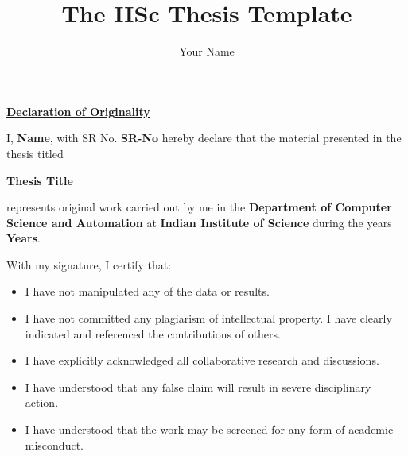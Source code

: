 
\title{The IISc Thesis Template}

\submitdate{\monthyeardate\today}
\mtechresearch
\author{Your Name}


\maketitle



\begin{center}
\LARGE{\underline{\textbf{Declaration of Originality}}}
\end{center}
\noindent I, \textbf{Name}, with SR No. \textbf{SR-No} hereby declare that
the material presented in the thesis titled

\begin{center}
\textbf{Thesis Title}
\end{center}

\noindent represents original work carried out by me in the \textbf{Department of Computer Science and Automation} at \textbf{Indian Institute of Science} during the years \textbf{Years}.

\noindent With my signature, I certify that:
\begin{itemize}
	\item I have not manipulated any of the data or results.
	\item I have not committed any plagiarism of intellectual
	property.
	I have clearly indicated and referenced the contributions of
	others.
	\item I have explicitly acknowledged all collaborative research
	and discussions.
	\item I have understood that any false claim will result in severe
	disciplinary action.
	\item I have understood that the work may be screened for any form
	of academic misconduct.
\end{itemize}

